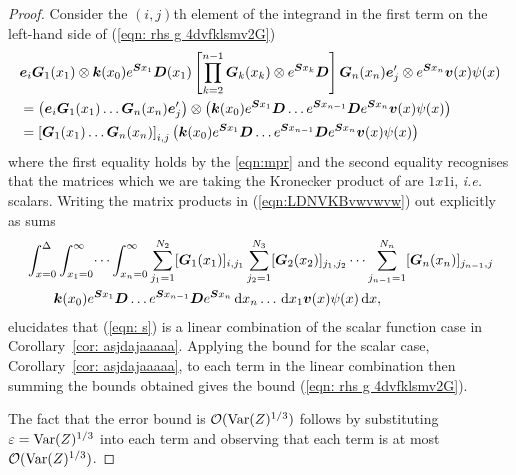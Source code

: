 \begin{proof} 
	Consider the \((i,j)\)th element of the integrand in the first term on the left-hand side of (\ref{eqn: rhs g 4dvfklsmv2G})
	\begin{align}
		&\boldsymbol e_i \boldsymbol G_1(x_1) \otimes \boldsymbol k(x_0) e^{\boldsymbol{S}x_1} \boldsymbol D (x_1) 
		\left[\prod_{k=2}^{n-1} \boldsymbol G_{k }(x_k) \otimes e^{\boldsymbol{S}x_k} \boldsymbol D\right] \nonumber
		\boldsymbol G_{n }(x_n)\boldsymbol e_j'{}\otimes e^{\boldsymbol{S}x_n} {\boldsymbol v}(x) \psi(x)\nonumber 
		\\&=\left(\boldsymbol e_i\boldsymbol G_1(x_1)\dots \boldsymbol G_n(x_n)\boldsymbol e_j'{}\right)\otimes \left(\boldsymbol k(x_0) e^{\boldsymbol{S}x_1} \boldsymbol D \dots 
		e^{\boldsymbol{S}x_{n-1}} \boldsymbol D \nonumber
		e^{\boldsymbol{S}x_n}{\boldsymbol v}(x) \psi(x) \right)
		\\&=\left[\boldsymbol G_1(x_1)\dots \boldsymbol G_n(x_n)\right]_{i,j} \left(\boldsymbol k(x_0) e^{\boldsymbol{S}x_1} \boldsymbol D \dots 
		e^{\boldsymbol{S}x_{n-1}} \boldsymbol D 
		e^{\boldsymbol{S}x_n} {\boldsymbol v}(x) \psi(x)\right) \label{eqn:LDNVKBvwvwvw}
    \end{align}
	where the first equality holds by the \ref{eqn:mpr} and the second equality recognises that the matrices which we are taking the Kronecker product of are \(1x1\)i, \emph{i.e.} scalars.
	Writing the matrix products in (\ref{eqn:LDNVKBvwvwvw}) out explicitly as sums 
	\begin{align}
		&\int_{x=0}^\Delta \int_{x_1=0}^\infty \dots \int_{x_n=0}^\infty \sum_{j_1=1}^{N_2}[\boldsymbol G_1(x_1)]_{i,j_1}\sum_{j_2=1}^{N_3}[\boldsymbol G_2(x_2)]_{j_1,j_2}\dots \sum_{j_{n-1}=1}^{N_n} [\boldsymbol G_n(x_n)]_{j_{n-1},j} \nonumber
		\\&\qquad{} \boldsymbol k(x_0) e^{\boldsymbol{S}x_1} \boldsymbol D  \dots
		e^{\boldsymbol{S}x_{n-1}} \boldsymbol D 
		e^{\boldsymbol{S}x_n} \, \mathrm{d} x_n \dots \, \mathrm{d} x_1 {\boldsymbol v}(x) \psi(x) \, \mathrm{d} x, \label{eqn: s}
	\end{align}
	elucidates that (\ref{eqn: s}) is a linear combination of the scalar function case in Corollary~\ref{cor: asjdajaaaaa}. Applying the bound for the scalar case, Corollary~\ref{cor: asjdajaaaaa}, to each term in the linear combination then summing the bounds obtained gives the bound (\ref{eqn: rhs g 4dvfklsmv2G}). 

	The fact that the error bound is \(\mathcal O(\mathrm{Var}(Z)^{1/3})\) follows by substituting \(\varepsilon=\mathrm{Var}(Z)^{1/3}\) into each term and observing that each term is at most \(\mathcal O(\mathrm{Var}(Z)^{1/3})\). 
\end{proof}
